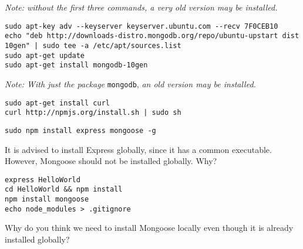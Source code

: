 \documentclass{article}
\begin{document}
\textit{Note: without the first three commands, a very old version may be installed.}


\begin{verbatim}
sudo apt-key adv --keyserver keyserver.ubuntu.com --recv 7F0CEB10
echo "deb http://downloads-distro.mongodb.org/repo/ubuntu-upstart dist 10gen" | sudo tee -a /etc/apt/sources.list
sudo apt-get update
sudo apt-get install mongodb-10gen
\end{verbatim}

\textit{Note: With just the package} \verb!mongodb!, \textit{an old version may be installed.}


\begin{verbatim}
sudo apt-get install curl
curl http://npmjs.org/install.sh | sudo sh
\end{verbatim}



\begin{verbatim}
sudo npm install express mongoose -g
\end{verbatim}

 It is advised to install Express globally, since it has a common executable. However, Mongoose should not be installed globally. Why?


\begin{verbatim}
express HelloWorld
cd HelloWorld && npm install
npm install mongoose
echo node_modules > .gitignore
\end{verbatim}

 Why do you think we need to install Mongoose locally even though it is already installed globally?

\end{document}
